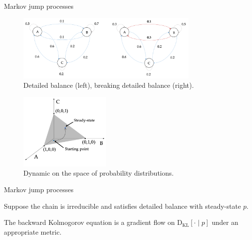 \documentclass{beamer}
\newcommand{\dkl}{\operatorname{D_{K L}}}
\begin{document}
\begin{frame}{Markov jump processes}
        \begin{figure}
        \centering
        \includegraphics[width=0.8\textwidth]{MC_breaking_detailed_balance.png}
        \caption{Detailed balance (left), breaking detailed balance (right).}
        \end{figure}
        \begin{figure}
        \centering
        \includegraphics[width=0.4\textwidth]{Simplex_trajectory_MC.png}
        \caption{Dynamic on the space of probability distributions.}
        \end{figure}

\end{frame}

\begin{frame}{Markov jump processes}
\begin{theorem}
Suppose the chain is irreducible and satisfies detailed balance with steady-state $p$.
\vspace{10pt}

The backward Kolmogorov equation is a gradient flow on $\dkl[\cdot \mid p]$ under an appropriate metric.
\end{theorem}
\end{frame}
\end{document}
